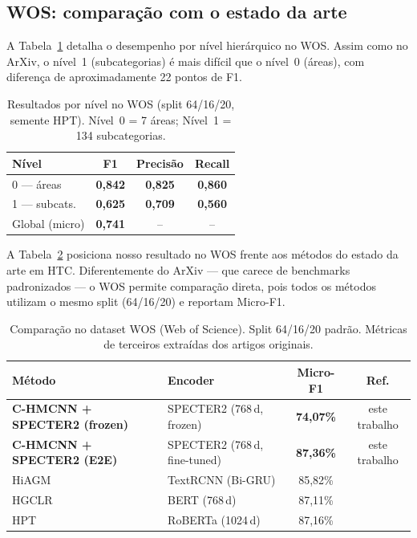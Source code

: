 \documentclass[11pt,a4paper,twoside]{article}
\newcommand{\ours}[1]{\textcolor{ourblue}{\textbf{#1}}}
\begin{document}
\subsection{WOS: comparação com o estado da arte}

A Tabela~\ref{tab:wos_levels} detalha o desempenho por nível hierárquico no WOS.
Assim como no ArXiv, o nível~1 (subcategorias) é mais difícil que o nível~0 (áreas),
com diferença de aproximadamente 22 pontos de F1.

\begin{table}[htbp]
\centering
\caption{Resultados por nível no WOS (split 64/16/20, semente HPT).
         Nível~0 = 7 áreas; Nível~1 = 134 subcategorias.}
\label{tab:wos_levels}
\begin{tabular}{lccc}
\toprule
\textbf{Nível} & \textbf{F1} & \textbf{Precisão} & \textbf{Recall} \\
\midrule
0 --- áreas      & \ours{0,842} & \ours{0,825} & \ours{0,860} \\
1 --- subcats.   & \ours{0,625} & \ours{0,709} & \ours{0,560} \\
\midrule
Global (micro)   & \ours{0,741} & --              & -- \\
\bottomrule
\end{tabular}
\end{table}

A Tabela~\ref{tab:wos_sota} posiciona nosso resultado no WOS frente aos métodos
do estado da arte em HTC. Diferentemente do ArXiv --- que carece de benchmarks
padronizados --- o WOS permite comparação direta, pois todos os métodos utilizam
o mesmo split (64/16/20) e reportam Micro-F1.

\begin{table}[htbp]
\centering
\footnotesize
\setlength{\tabcolsep}{4pt}
\caption{Comparação no dataset WOS (Web of Science). Split 64/16/20 padrão.
         Métricas de terceiros extraídas dos artigos originais.}
\label{tab:wos_sota}
\begin{tabular}{llcc}
\toprule
\textbf{Método} & \textbf{Encoder} & \textbf{Micro-F1} & \textbf{Ref.} \\
\midrule
\ours{C-HMCNN + SPECTER2 (frozen)} & SPECTER2 (768\,d, frozen)
    & \ours{74,07\%} & este trabalho \\
\ours{C-HMCNN + SPECTER2 (E2E)}   & SPECTER2 (768\,d, fine-tuned)
    & \ours{87,36\%} & este trabalho \\
\midrule
HiAGM                      & TextRCNN (Bi-GRU)
    & 85,82\%   & \cite{zhou2020hiagm} \\
HGCLR                      & BERT (768\,d)
    & 87,11\%   & \cite{wang2022hgclr} \\
HPT                        & RoBERTa (1024\,d)
    & 87,16\%   & \cite{wang2022hpt} \\
\bottomrule
\end{tabular}
\end{table}
\end{document}
